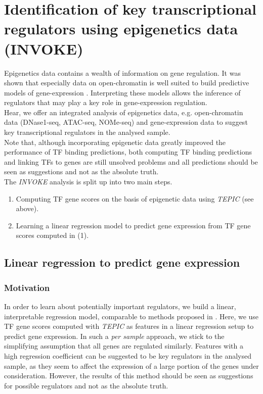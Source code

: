 \documentclass{article}
\begin{document}
\section{Identification of key transcriptional regulators using epigenetics data (INVOKE)}
Epigenetics data contains a wealth of information on gene regulation. It was shown that especially
data on open-chromatin is well suited to build predictive models of gene-expression \cite{pmid27899623,pmid22955983,pmid25231769,pmid22954627}.
Interpreting these models allows the inference of regulators that may play a key role in gene-expression regulation.
\bigskip
\\Hear, we offer an integrated analysis of epigenetics data, e.g. open-chromatin data (DNase1-seq, ATAC-seq, NOMe-seq) and gene-expression data
to suggest key transcriptional regulators in the analysed sample.
\bigskip
\\Note that, although incorporating epigenetic data greatly improved the performance of TF binding predictions, both computing TF binding predictions and linking TFs to genes are still unsolved problems and all predictions
should be seen as suggestions and not as the absolute truth.
\bigskip
\\The \textit{INVOKE} analysis is split up into two main steps. 
\begin{enumerate}
\item Computing TF gene scores on the basis of epigenetic data using \textit{TEPIC} (see above).
\item Learning a linear regression model to predict gene expression from TF gene scores computed in (1).
\end{enumerate}

\subsection{Linear regression to predict gene expression}
\subsubsection{Motivation}
In order to learn about potentially important regulators, we build a linear, interpretable regression model, 
comparable to methods proposed in \cite{pmid27899623,pmid22955983,pmid25231769,pmid22954627}.
Here, we use TF gene scores computed with \textit{TEPIC} as features in a linear regression setup to predict gene expression.
In such a \textit{per sample} approach, we stick to the simplifying assumption that all genes are regulated similarly. 
Features with a high regression coefficient can be suggested to be key regulators in the analysed sample, as they seem to affect the expression
of a large portion of the genes under consideration. However, the results of this method should be seen as suggestions for possible regulators and not as the absolute truth. 
\end{document}
